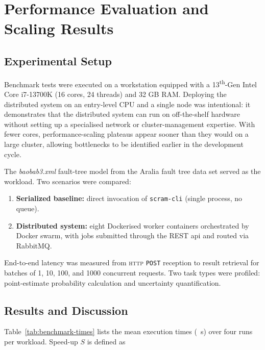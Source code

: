 {

\section{Performance Evaluation and Scaling Results}
\label{sec:scaling-results}

\subsection{Experimental Setup}
\label{subsec:exp-setup}

Benchmark tests were executed on a workstation equipped with a 13\textsuperscript{th}-Gen Intel\textsuperscript{\textregistered} Core\textsuperscript{\texttrademark} i7-13700K (16 cores, 24 threads) and 32 GB RAM. Deploying the distributed system on an entry-level CPU and a single node was intentional: it demonstrates that the distributed system can run on off-the-shelf hardware without setting up a specialised network or cluster-management expertise. With fewer cores, performance-scaling plateaus appear sooner than they would on a large cluster, allowing bottlenecks to be identified earlier in the development cycle.

The \textit{baobab3.xml} fault-tree model from the Aralia fault tree data set served as the workload. Two scenarios were compared:

\begin{enumerate}
  \item \textbf{Serialized baseline:} direct invocation of \texttt{scram-cli} (single process, no queue).
  \item \textbf{Distributed system:} eight Dockerised worker containers orchestrated by Docker swarm, with jobs submitted through the REST \acrshort{api} and routed via RabbitMQ.
\end{enumerate}

End-to-end latency was measured from \textsc{http} \texttt{POST} reception to result retrieval for batches of 1, 10, 100, and 1000 concurrent requests. Two task types were profiled: point-estimate probability calculation and uncertainty quantification.

\subsection{Results and Discussion}
\label{subsec:scaling-discussion}

Table~\ref{tab:benchmark-times} lists the mean execution times (\SI{}{\second}) over four runs per workload.  
Speed-up $S$ is defined as


}
